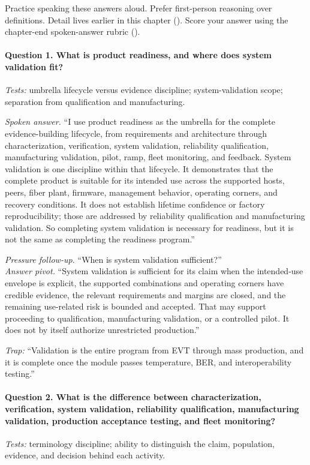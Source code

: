Practice speaking these answers aloud. Prefer first-person reasoning over
definitions. Detail lives earlier in this chapter
().
Score your answer using the chapter-end spoken-answer rubric
().

\paragraph{Question 1. What is product readiness, and where does system
validation fit?}
\textit{Tests:} umbrella lifecycle versus evidence discipline;
system-validation scope; separation from qualification and manufacturing.

\textit{Spoken answer.}
``I use product readiness as the umbrella for the complete evidence-building
lifecycle, from requirements and architecture through characterization,
verification, system validation, reliability qualification, manufacturing
validation, pilot, ramp, fleet monitoring, and feedback. System validation is
one discipline within that lifecycle. It demonstrates that the complete product
is suitable for its intended use across the supported hosts, peers, fiber plant,
firmware, management behavior, operating corners, and recovery conditions. It
does not establish lifetime confidence or factory reproducibility; those are
addressed by reliability qualification and manufacturing validation. So
completing system validation is necessary for readiness, but it is not the same
as completing the readiness program.''

\textit{Pressure follow-up.} ``When is system validation sufficient?''\\
\textit{Answer pivot.} ``System validation is sufficient for its claim when the
intended-use envelope is explicit, the supported combinations and operating
corners have credible evidence, the relevant requirements and margins are
closed, and the remaining use-related risk is bounded and accepted. That may
support proceeding to qualification, manufacturing validation, or a controlled
pilot. It does not by itself authorize unrestricted production.''

\textit{Trap:} ``Validation is the entire program from EVT through mass
production, and it is complete once the module passes temperature, BER, and
interoperability testing.''

\paragraph{Question 2. What is the difference between characterization,
verification, system validation, reliability qualification, manufacturing
validation, production acceptance testing, and fleet monitoring?}
\textit{Tests:} terminology discipline; ability to distinguish the claim,
population, evidence, and decision behind each activity.

